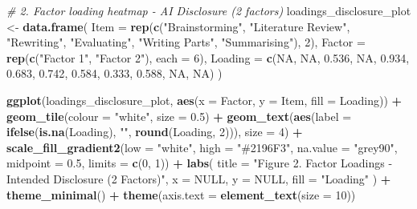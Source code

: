 \documentclass[
]{article}
\newenvironment{Shaded}{\begin{snugshade}}{\end{snugshade}}
\newcommand{\AttributeTok}[1]{\textcolor[rgb]{0.13,0.29,0.53}{#1}}
\newcommand{\CommentTok}[1]{\textcolor[rgb]{0.56,0.35,0.01}{\textit{#1}}}
\newcommand{\ConstantTok}[1]{\textcolor[rgb]{0.56,0.35,0.01}{#1}}
\newcommand{\DecValTok}[1]{\textcolor[rgb]{0.00,0.00,0.81}{#1}}
\newcommand{\FloatTok}[1]{\textcolor[rgb]{0.00,0.00,0.81}{#1}}
\newcommand{\FunctionTok}[1]{\textcolor[rgb]{0.13,0.29,0.53}{\textbf{#1}}}
\newcommand{\NormalTok}[1]{#1}
\newcommand{\OtherTok}[1]{\textcolor[rgb]{0.56,0.35,0.01}{#1}}
\newcommand{\SpecialCharTok}[1]{\textcolor[rgb]{0.81,0.36,0.00}{\textbf{#1}}}
\newcommand{\StringTok}[1]{\textcolor[rgb]{0.31,0.60,0.02}{#1}}
\begin{document}
\begin{Shaded}
\begin{Highlighting}[]
\CommentTok{\# 2. Factor loading heatmap {-} AI Disclosure (2 factors)}
\NormalTok{loadings\_disclosure\_plot }\OtherTok{\textless{}{-}} \FunctionTok{data.frame}\NormalTok{(}
  \AttributeTok{Item =} \FunctionTok{rep}\NormalTok{(}\FunctionTok{c}\NormalTok{(}\StringTok{"Brainstorming"}\NormalTok{, }\StringTok{"Literature Review"}\NormalTok{, }\StringTok{"Rewriting"}\NormalTok{,}
               \StringTok{"Evaluating"}\NormalTok{, }\StringTok{"Writing Parts"}\NormalTok{, }\StringTok{"Summarising"}\NormalTok{), }\DecValTok{2}\NormalTok{),}
  \AttributeTok{Factor =} \FunctionTok{rep}\NormalTok{(}\FunctionTok{c}\NormalTok{(}\StringTok{"Factor 1"}\NormalTok{, }\StringTok{"Factor 2"}\NormalTok{), }\AttributeTok{each =} \DecValTok{6}\NormalTok{),}
  \AttributeTok{Loading =} \FunctionTok{c}\NormalTok{(}\ConstantTok{NA}\NormalTok{, }\ConstantTok{NA}\NormalTok{, }\FloatTok{0.536}\NormalTok{, }\ConstantTok{NA}\NormalTok{, }\FloatTok{0.934}\NormalTok{, }\FloatTok{0.683}\NormalTok{,}
              \FloatTok{0.742}\NormalTok{, }\FloatTok{0.584}\NormalTok{, }\FloatTok{0.333}\NormalTok{, }\FloatTok{0.588}\NormalTok{, }\ConstantTok{NA}\NormalTok{, }\ConstantTok{NA}\NormalTok{)}
\NormalTok{)}

\FunctionTok{ggplot}\NormalTok{(loadings\_disclosure\_plot, }\FunctionTok{aes}\NormalTok{(}\AttributeTok{x =}\NormalTok{ Factor, }\AttributeTok{y =}\NormalTok{ Item, }\AttributeTok{fill =}\NormalTok{ Loading)) }\SpecialCharTok{+}
  \FunctionTok{geom\_tile}\NormalTok{(}\AttributeTok{colour =} \StringTok{"white"}\NormalTok{, }\AttributeTok{size =} \FloatTok{0.5}\NormalTok{) }\SpecialCharTok{+}
  \FunctionTok{geom\_text}\NormalTok{(}\FunctionTok{aes}\NormalTok{(}\AttributeTok{label =} \FunctionTok{ifelse}\NormalTok{(}\FunctionTok{is.na}\NormalTok{(Loading), }\StringTok{""}\NormalTok{, }\FunctionTok{round}\NormalTok{(Loading, }\DecValTok{2}\NormalTok{))),}
            \AttributeTok{size =} \DecValTok{4}\NormalTok{) }\SpecialCharTok{+}
  \FunctionTok{scale\_fill\_gradient2}\NormalTok{(}\AttributeTok{low =} \StringTok{"white"}\NormalTok{, }\AttributeTok{high =} \StringTok{"\#2196F3"}\NormalTok{, }
                       \AttributeTok{na.value =} \StringTok{"grey90"}\NormalTok{, }\AttributeTok{midpoint =} \FloatTok{0.5}\NormalTok{,}
                       \AttributeTok{limits =} \FunctionTok{c}\NormalTok{(}\DecValTok{0}\NormalTok{, }\DecValTok{1}\NormalTok{)) }\SpecialCharTok{+}
  \FunctionTok{labs}\NormalTok{(}
    \AttributeTok{title =} \StringTok{"Figure 2. Factor Loadings {-} Intended Disclosure (2 Factors)"}\NormalTok{,}
    \AttributeTok{x =} \ConstantTok{NULL}\NormalTok{,}
    \AttributeTok{y =} \ConstantTok{NULL}\NormalTok{,}
    \AttributeTok{fill =} \StringTok{"Loading"}
\NormalTok{  ) }\SpecialCharTok{+}
  \FunctionTok{theme\_minimal}\NormalTok{() }\SpecialCharTok{+}
  \FunctionTok{theme}\NormalTok{(}\AttributeTok{axis.text =} \FunctionTok{element\_text}\NormalTok{(}\AttributeTok{size =} \DecValTok{10}\NormalTok{))}
\end{Highlighting}
\end{Shaded}
\end{document}
